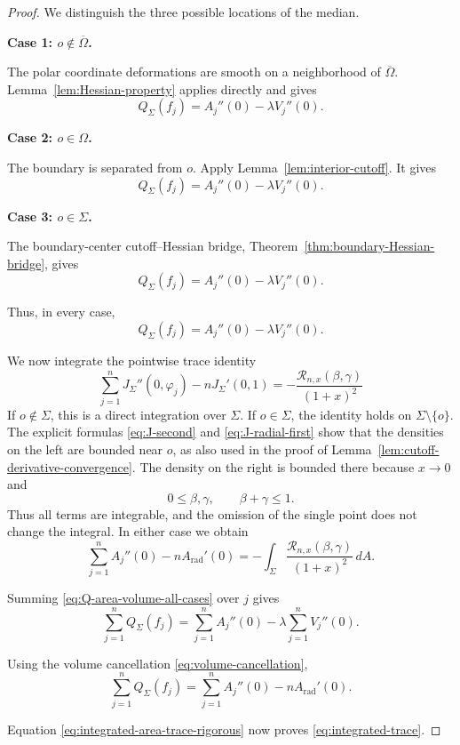 \documentclass[11pt,reqno]{amsart}
\numberwithin{equation}{section}
\theoremstyle{definition}
\theoremstyle{remark}
\begin{document}
\begin{proof}
We distinguish the three possible locations of the median.

\medskip
\noindent
\textbf{Case 1: \(o\notin\overline\Omega\).}

The polar coordinate deformations are smooth on a neighborhood of
\(\overline\Omega\). Lemma~\ref{lem:Hessian-property} applies directly and
gives
\[
Q_\Sigma(f_j)
=
A_j''(0)-\lambda V_j''(0).
\]

\medskip
\noindent
\textbf{Case 2: \(o\in\Omega\).}

The boundary is separated from \(o\). Apply
Lemma~\ref{lem:interior-cutoff}. It gives
\[
Q_\Sigma(f_j)
=
A_j''(0)-\lambda V_j''(0).
\]

\medskip
\noindent
\textbf{Case 3: \(o\in\Sigma\).}

The boundary-center cutoff--Hessian bridge,
Theorem~\ref{thm:boundary-Hessian-bridge}, gives
\[
Q_\Sigma(f_j)
=
A_j''(0)-\lambda V_j''(0).
\]

Thus, in every case,
\begin{equation}
Q_\Sigma(f_j)
=
A_j''(0)-\lambda V_j''(0).
\label{eq:Q-area-volume-all-cases}
\end{equation}

We now integrate the pointwise trace identity
\[
\sum_{j=1}^n
J_\Sigma''(0,\varphi_j)
-
nJ_\Sigma'(0,1)
=
-
\frac{
\mathcal R_{n,x}(\beta,\gamma)
}{
(1+x)^2
}
\]
If \(o\notin\Sigma\), this is a direct integration over \(\Sigma\). If
\(o\in\Sigma\), the identity holds on \(\Sigma\setminus\{o\}\). The
explicit formulas \eqref{eq:J-second} and \eqref{eq:J-radial-first} show
that the densities on the left are bounded near \(o\), as also used in the
proof of Lemma~\ref{lem:cutoff-derivative-convergence}. The density on the
right is bounded there because \(x\to0\) and
\[
0\le\beta,\gamma,
\qquad
\beta+\gamma\le1.
\]
Thus all terms are integrable, and the omission of the single point does
not change the integral. In either case we obtain
\begin{equation}
\sum_{j=1}^nA_j''(0)
-
nA_{\mathrm{rad}}'(0)
=
-
\int_\Sigma
\frac{
\mathcal R_{n,x}(\beta,\gamma)
}{
(1+x)^2
}\,dA.
\label{eq:integrated-area-trace-rigorous}
\end{equation}

Summing \eqref{eq:Q-area-volume-all-cases} over \(j\) gives
\[
\sum_{j=1}^nQ_\Sigma(f_j)
=
\sum_{j=1}^nA_j''(0)
-
\lambda\sum_{j=1}^nV_j''(0).
\]

Using the volume cancellation
\eqref{eq:volume-cancellation},
\[
\sum_{j=1}^nQ_\Sigma(f_j)
=
\sum_{j=1}^nA_j''(0)
-
nA_{\mathrm{rad}}'(0).
\]

Equation \eqref{eq:integrated-area-trace-rigorous} now proves
\eqref{eq:integrated-trace}.
\end{proof}
\end{document}
